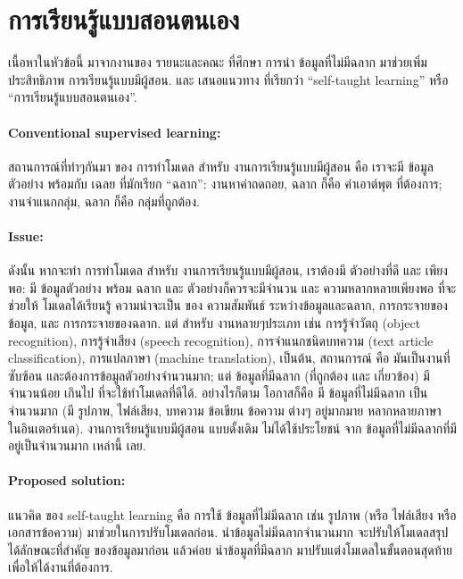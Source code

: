 \section{การเรียนรู้แบบสอนตนเอง}
\label{deep learning: self-taught learning}

เนื้อหาในหัวข้อนี้ มาจากงานของ รายนะและคณะ \cite{RainaEtAl2007a} ที่ศึกษา การนำ ข้อมูลที่ไม่มีฉลาก มาช่วยเพิ่มประสิทธิภาพ การเรียนรู้แบบมีผู้สอน. 
และ เสนอแนวทาง ที่เรียกว่า ``self-taught learning'' หรือ ``การเรียนรู้แบบสอนตนเอง''.

\paragraph{Conventional supervised learning:} สถานการณ์ที่ทำๆกันมา ของ การทำโมเดล สำหรับ งานการเรียนรู้แบบมีผู้สอน คือ เราจะมี ข้อมูลตัวอย่าง พร้อมกับ เฉลย ที่มักเรียก ``ฉลาก'':
งานหาค่าถดถอย, ฉลาก ก็คือ ค่าเอาต์พุต ที่ต้องการ;
งานจำแนกกลุ่ม, ฉลาก ก็คือ กลุ่มที่ถูกต้อง.

\paragraph{Issue:} ดังนั้น หากจะทำ การทำโมเดล สำหรับ งานการเรียนรู้แบบมีผู้สอน, เราต้องมี ตัวอย่างที่ดี และ เพียงพอ: มี ข้อมูลตัวอย่าง พร้อม ฉลาก และ ตัวอย่างก็ควรจะมีจำนวน และ ความหลากหลายเพียงพอ ที่จะช่วยให้ โมเดลได้เรียนรู้ ความน่าจะเป็น ของ ความสัมพันธ์ ระหว่างข้อมูลและฉลาก, การกระจายของข้อมูล, และ การกระจายของฉลาก.
แต่ สำหรับ งานหลายๆประเภท เช่น การรู้จำวัตถุ (object recognition), การรู้จำเสียง (speech recognition), การจำแนกชนิดบทความ (text article classification), การแปลภาษา (machine translation), เป็นต้น, สถานการณ์ คือ มันเป็นงานที่ซับซ้อน และต้องการข้อมูลตัวอย่างจำนวนมาก;
แต่ ข้อมูลที่มีฉลาก (ที่ถูกต้อง และ เกี่ยวข้อง) มีจำนวนน้อย เกินไป ที่จะใช้ทำโมเดลที่ดีได้.
อย่างไรก็ตาม โอกาสก็คือ มี ข้อมูลที่ไม่มีฉลาก เป็นจำนวนมาก (มี รูปภาพ, ไฟล์เสียง, บทความ ข้อเขียน ข้อความ ต่างๆ อยู่มากมาย หลากหลายภาษา ในอินเตอร์เนต).
งานการเรียนรู้แบบมีผู้สอน แบบดั้งเดิม ไม่ได้ใช้ประโยชน์ จาก ข้อมูลที่ไม่มีฉลากที่มีอยู่เป็นจำนวนมาก เหล่านี้ เลย.

\paragraph{Proposed solution:} แนวคิด ของ self-taught learning คือ การใช้ ข้อมูลที่ไม่มีฉลาก เช่น รูปภาพ (หรือ ไฟล์เสียง หรือ เอกสารข้อความ) มาช่วยในการปรับโมเดลก่อน.
นำข้อมูลไม่มีฉลากจำนวนมาก จะปรับให้โมเดลสรุปได้ลักษณะที่สำคัญ ของข้อมูลมาก่อน
แล้วค่อย นำข้อมูลที่มีฉลาก มาปรับแต่งโมเดลในขั้นตอนสุดท้าย เพื่อให้ได้งานที่ต้องการ.

